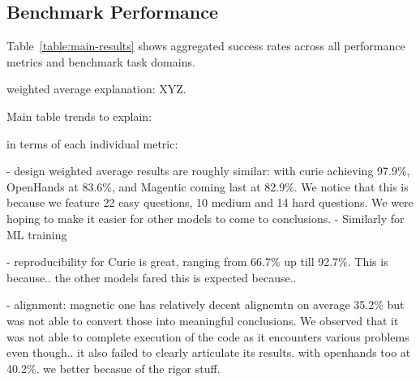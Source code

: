 
\subsection{Benchmark Performance} 
\label{subsec:main-results}
Table~\ref{table:main-results} shows aggregated success rates across all performance metrics and benchmark task domains.


weighted average explanation: XYZ. 

Main table trends to explain:

in terms of each individual metric: 

- design weighted average results are roughly  similar: with curie achieving 97.9\%, OpenHands at 83.6\%, and Magentic coming last at 82.9\%. We notice that this is because we feature 22 easy questions, 10 medium and 14 hard questions. We were hoping to make it easier for other models to come to conclusions. 
- Similarly for ML training

- reproducibility for Curie is great, ranging from 66.7\% up till 92.7\%. This is because.. the other models fared this is expected because.. 

- alignment: magnetic one has relatively decent alignemtn on average 35.2\% but was not able to convert those into meaningful conclusions. We observed that it was not able to complete execution of the code as it encounters various problems even though.. it also failed to clearly articulate its results.  with openhands too at 40.2\%. we better becasue of the rigor stuff. 


